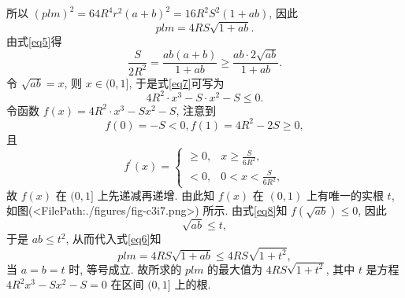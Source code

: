 所以 $(p l m)^2=64 R^4 r^2(a+b)^2=16 R^2 S^2(1+a b)$,
因此
$$
p l m=4 R S \sqrt{1+a b} . \label{eq6}
$$
由式\ref{eq5}得
$$
\frac{S}{2 R^2}=\frac{a b(a+b)}{1+a b} \geqslant \frac{a b \cdot 2 \sqrt{a b}}{1+a b} . \label{eq7}
$$
令 $\sqrt{a b}=x$, 则 $x \in(0,1]$, 于是式\ref{eq7}可写为
$$
4 R^2 \cdot x^3-S \cdot x^2-S \leqslant 0 . \label{eq8}
$$
令函数 $f(x)=4 R^2 \cdot x^3-S x^2-S$, 注意到
$$
f(0)=-S<0, f(1)=4 R^2-2 S \geqslant 0,
$$
且
$$
f^{\prime}(x)= \begin{cases}\geqslant 0, & x \geqslant \frac{S}{6 R^2}, \\ <0, & 0<x<\frac{S}{6 R^2},\end{cases}
$$
故 $f(x)$ 在 $(0,1]$ 上先递减再递增.
由此知 $f(x)$ 在 $(0,1)$ 上有唯一的实根 $t$, 如图(<FilePath:./figures/fig-c3i7.png>) 所示.
由式\ref{eq8}知 $f(\sqrt{a b}) \leqslant 0$, 因此
$$
\sqrt{a b} \leqslant t,
$$
于是 $a b \leqslant t^2$, 从而代入式\ref{eq6}知
$$
p l m=4 R S \sqrt{1+a b} \leqslant 4 R S \sqrt{1+t^2},
$$
当 $a=b=t$ 时, 等号成立.
故所求的 $p l m$ 的最大值为 $4 R S \sqrt{1+t^2}$, 其中 $t$ 是方程 $4 R^2 x^3-S x^2-S=0$ 在区间 $(0,1]$ 上的根.


